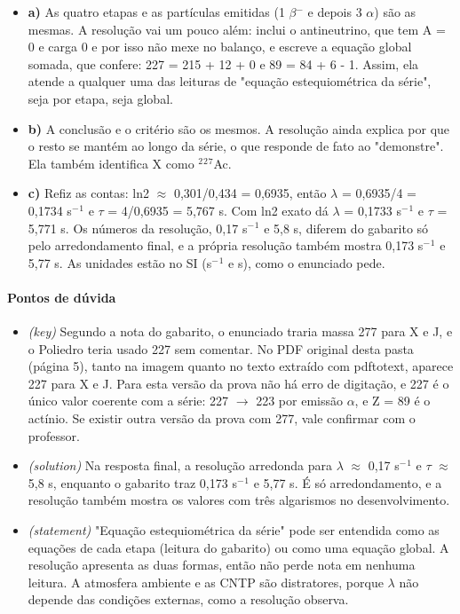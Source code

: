 \documentclass{article}%
\begin{document}
\begin{itemize}%
\item%
\textbf{a)} As quatro etapas e as partículas emitidas (1 $\beta$$^{-}$ e depois 3 $\alpha$) são as mesmas. A resolução vai um pouco além: inclui o antineutrino, que tem A = 0 e carga 0 e por isso não mexe no balanço, e escreve a equação global somada, que confere: 227 = 215 + 12 + 0 e 89 = 84 + 6 - 1. Assim, ela atende a qualquer uma das leituras de "equação estequiométrica da série", seja por etapa, seja global.%
\item%
\textbf{b)} A conclusão e o critério são os mesmos. A resolução ainda explica por que o resto se mantém ao longo da série, o que responde de fato ao "demonstre". Ela também identifica X como $^2$$^2$$^{7}$Ac.%
\item%
\textbf{c)} Refiz as contas: ln2 $\approx$ 0,301/0,434 = 0,6935, então $\lambda$ = 0,6935/4 = 0,1734 s$^{-}$$^{1}$ e $\tau$ = 4/0,6935 = 5,767 s. Com ln2 exato dá $\lambda$ = 0,1733 s$^{-}$$^{1}$ e $\tau$ = 5,771 s. Os números da resolução, 0,17 s$^{-}$$^{1}$ e 5,8 s, diferem do gabarito só pelo arredondamento final, e a própria resolução também mostra 0,173 s$^{-}$$^{1}$ e 5,77 s. As unidades estão no SI (s$^{-}$$^{1}$ e s), como o enunciado pede.%
\end{itemize}%
\paragraph{Pontos de dúvida}%
\begin{itemize}%
\item%
\textit{(key)} Segundo a nota do gabarito, o enunciado traria massa 277 para X e J, e o Poliedro teria usado 227 sem comentar. No PDF original desta pasta (página 5), tanto na imagem quanto no texto extraído com pdftotext, aparece 227 para X e J. Para esta versão da prova não há erro de digitação, e 227 é o único valor coerente com a série: 227 $\to$ 223 por emissão $\alpha$, e Z = 89 é o actínio. Se existir outra versão da prova com 277, vale confirmar com o professor.%
\item%
\textit{(solution)} Na resposta final, a resolução arredonda para $\lambda$ $\approx$ 0,17 s$^{-}$$^{1}$ e $\tau$ $\approx$ 5,8 s, enquanto o gabarito traz 0,173 s$^{-}$$^{1}$ e 5,77 s. É só arredondamento, e a resolução também mostra os valores com três algarismos no desenvolvimento.%
\item%
\textit{(statement)} "Equação estequiométrica da série" pode ser entendida como as equações de cada etapa (leitura do gabarito) ou como uma equação global. A resolução apresenta as duas formas, então não perde nota em nenhuma leitura. A atmosfera ambiente e as CNTP são distratores, porque $\lambda$ não depende das condições externas, como a resolução observa.%
\end{itemize}%
\end{document}
